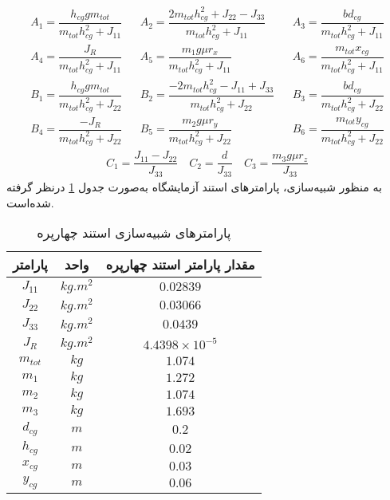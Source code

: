 \begin{align*}
	&A_1  = \dfrac{h_{cg}gm_{tot}}{m_{tot}h_{cg}^2+J_{11}}& 
	&A_2  =  \dfrac{2m_{tot}h_{cg}^2+J_{22}-J_{33}}{m_{tot}h_{cg}^2+J_{11}}& 
	&A_3  =  \dfrac{bd_{cg}}{m_{tot}h_{cg}^2+J_{11}}& 	\\
	& A_4  =  \dfrac{J_R}{m_{tot}h_{cg}^2+J_{11}} & 
	& A_5 =  \dfrac{m_1g\mu r_x}{m_{tot}h_{cg}^2 + J_{11}} & 
	& A_6= \dfrac{m_{tot}x_{cg}}{m_{tot}h_{cg}^2+J_{11}} \\
	&B_1  =  \dfrac{h_{cg}gm_{tot}}{m_{tot}h_{cg}^2+J_{22}}& 
	&B_2 =  \dfrac{-2m_{tot}h_{cg}^2-J_{11}+J_{33}}{m_{tot}h_{cg}^2+J_{22}}& 
	&B_3  =  \dfrac{bd_{cg}}{m_{tot}h_{cg}^2+J_{22}}& \\
	&B_4 =  \dfrac{-J_R}{m_{tot}h_{cg}^2+J_{22}}& 
	& B_5 =  \dfrac{m_2g\mu r_y}{m_{tot}h_{cg}^2 + J_{22}}& 
	& B_6= \dfrac{m_{tot}y_{cg}}{m_{tot}h_{cg}^2+J_{22}} 
\end{align*}
\begin{align*}
	C_1 =\dfrac{J_{11}-J_{22}}{J_{33}}\quad
	C_2 =\dfrac{d}{J_{33}}\quad
	C_3 = \dfrac{m_3g\mu r_z}{ J_{33}}
\end{align*}
به منظور شبیه‌سازی، پارامترهای استند آزمایشگاه به‌صورت جدول 
\ref{parameterstable}
درنظر گرفته شده‌است.

\vspace{0.5cm}
\begin{table}[H]
	\caption {پارامترهای شبیه‌سازی استند چهارپره \cite{norian}} 
	\label{parameterstable}
	\begin{center}
		\begin{tabular}{ c c c }
			\hline
	پارامتر & واحد & مقدار پارامتر استند چهارپره    \\
			\hline

			$J_{11}$ & $kg.m^2$& $0.02839$    \\
			$J_{22}$ & $kg.m^2$& $0.03066$   \\
			$J_{33}$ & $kg.m^2$&$0.0439$    \\
			$J_{R}$   & $kg.m^2$&$4.4398\times 10^{-5}$\\
			$m_{tot}$ & $kg$& $1.074$    \\
			$m_{1}$ & $kg$& $1.272$    \\
			$m_{2}$ & $kg$& $1.074$    \\
			$m_{3}$ & $kg$& $1.693$    \\
			$d_{cg}$ & $m$ &$0.2$     \\
			$h_{cg}$ & $m$  &$0.02$   \\
$x_{cg}$ & $m$  &$0.03$   \\
$y_{cg}$ & $m$  &$0.06$   \\


			\hline
		\end{tabular}
	\end{center}
\end{table}


